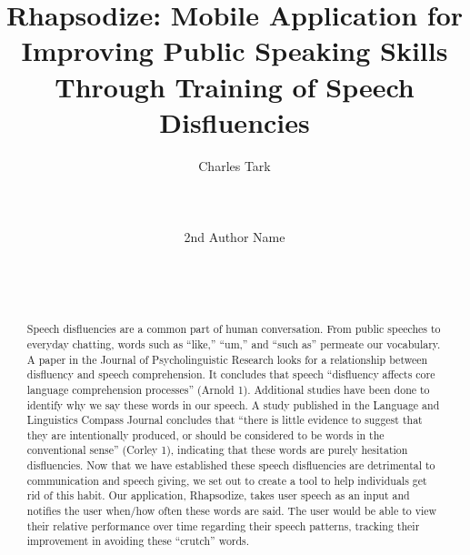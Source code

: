 \documentclass{sigchi}
\begin{document}
\title{Rhapsodize: Mobile Application for Improving Public Speaking Skills Through Training of Speech Disfluencies}

\author{
  \alignauthor Charles Tark\\
    \\
    \\
    \\
  \alignauthor 2nd Author Name\\
    \\
    \\
    \\
}

\maketitle

\begin{abstract}
Speech disfluencies are a common part of human conversation. From public speeches to everyday chatting, words such as “like,” “um,” and “such as” permeate our vocabulary. A paper in the Journal of Psycholinguistic Research looks for a relationship between disfluency and speech comprehension. It concludes that speech “disfluency affects core language comprehension processes” (Arnold 1). Additional studies have been done to identify why we say these words in our speech. A study published in the Language and Linguistics Compass Journal concludes that “there is little evidence to suggest that they are intentionally produced, or should be considered to be words in the conventional sense” (Corley 1), indicating that these words are purely hesitation disfluencies. Now that we have established these speech disfluencies are detrimental to communication and speech giving, we set out to create a tool to help individuals get rid of this habit. Our application, Rhapsodize, takes user speech as an input and notifies the user when/how often these words are said. The user would be able to view their relative performance over time regarding their speech patterns, tracking their improvement in avoiding these “crutch” words.
\end{abstract}

\end{document}
